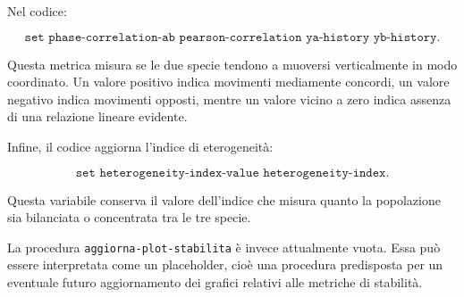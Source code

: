 Nel codice:

\[
\texttt{set phase-correlation-ab pearson-correlation ya-history yb-history}.
\]

Questa metrica misura se le due specie tendono a muoversi verticalmente in modo
coordinato. Un valore positivo indica movimenti mediamente concordi, un valore
negativo indica movimenti opposti, mentre un valore vicino a zero indica assenza
di una relazione lineare evidente.

Infine, il codice aggiorna l'indice di eterogeneità:

\[
\texttt{set heterogeneity-index-value heterogeneity-index}.
\]

Questa variabile conserva il valore dell'indice che misura quanto la popolazione
sia bilanciata o concentrata tra le tre specie.

La procedura \texttt{aggiorna-plot-stabilita} è invece attualmente vuota. Essa
può essere interpretata come un placeholder, cioè una procedura predisposta per
un eventuale futuro aggiornamento dei grafici relativi alle metriche di
stabilità.